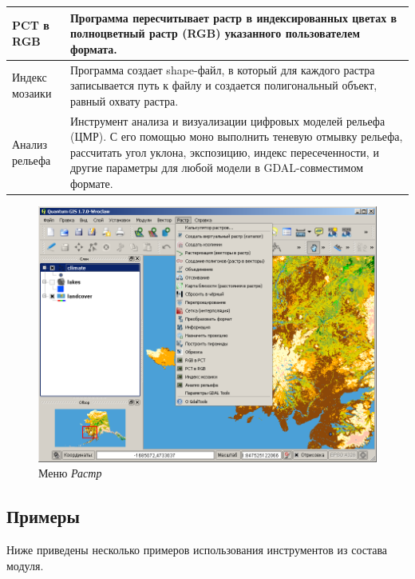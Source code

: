 {\begin{longtable}{|p{3cm}|p{13cm}|}
\hline PCT в RGB &  Программа пересчитывает растр в индексированных цветах в
 полноцветный растр (RGB) указанного пользователем формата.\\
\hline Индекс мозаики & Программа создает shape-файл, в который для каждого
 растра записывается путь к файлу и создается полигональный объект, равный
 охвату растра.\\
\hline Анализ рельефа &  Инструмент анализа и визуализации цифровых моделей
 рельефа (ЦМР). С его помощью моно выполнить теневую отмывку рельефа, рассчитать
 угол уклона, экспозицию, индекс пересеченности, и другие параметры для любой
 модели в GDAL-совместимом формате.\\
\hline
\end{longtable}

\begin{figure}[ht]
   \centering
   \includegraphics[clip=true, width=12cm]{plugins_gdaltools_images/raster_menu}
   \caption{\label{gdaltools_menu}Меню \emph{Растр} \wincaption}
\end{figure}

\subsection{Примеры}\label{gdal_examples}
Ниже приведены несколько примеров использования инструментов из состава модуля.
}
